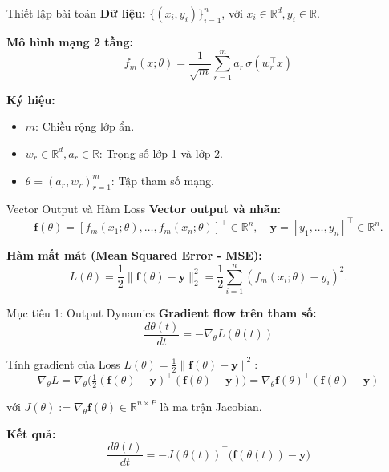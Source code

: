 \begin{frame}{Thiết lập bài toán}
  \textbf{Dữ liệu:} $\{(x_i,y_i)\}_{i=1}^n$, với $x_i \in \mathbb R^d, y_i \in \mathbb R$.

  \vspace{0.4cm}
  \textbf{Mô hình mạng 2 tầng:}
  \[
    f_m(x;\theta) = \frac{1}{\sqrt{m}} \sum_{r=1}^m a_r\,\sigma(w_r^\top x)
  \]
  
  \textbf{Ký hiệu:}
  \begin{itemize}
    \item $m$: Chiều rộng lớp ẩn.
    \item $w_r \in \mathbb R^d, a_r \in \mathbb R$: Trọng số lớp 1 và lớp 2.
    \item $\theta = (a_r, w_r)_{r=1}^m$: Tập tham số mạng.
  \end{itemize}
\end{frame}

\begin{frame}{Vector Output và Hàm Loss}
  \textbf{Vector output và nhãn:}
  \[
    \mathbf{f}(\theta) = [f_m(x_1;\theta), \dots, f_m(x_n;\theta)]^\top \in \mathbb{R}^n,
    \quad
    \mathbf{y} = [y_1, \dots, y_n]^\top \in \mathbb{R}^n.
  \]

  \textbf{Hàm mất mát (Mean Squared Error - MSE):}
  \[
    L(\theta) = \frac{1}{2} \|\mathbf{f}(\theta) - \mathbf{y}\|^2_2
              = \frac{1}{2} \sum_{i=1}^n (f_m(x_i;\theta) - y_i)^2.
  \]
\end{frame}

\begin{frame}{Mục tiêu 1: Output Dynamics}
  \textbf{Gradient flow trên tham số:}
  \[
    \frac{d\theta(t)}{dt} = -\nabla_\theta L(\theta(t))
  \]
  
  Tính gradient của Loss $L(\theta) = \frac{1}{2}\|\mathbf{f}(\theta) - \mathbf{y}\|^2$:
  \[
    \nabla_\theta L
    = \nabla_\theta \Big( \tfrac{1}{2}(\mathbf{f}(\theta) - \mathbf{y})^\top (\mathbf{f}(\theta) - \mathbf{y}) \Big)
    = \nabla_\theta \mathbf{f}(\theta)^\top (\mathbf{f}(\theta) - \mathbf{y})
  \]

  với $J(\theta) := \nabla_\theta \mathbf{f}(\theta) \in \mathbb{R}^{n \times P}$ là ma trận Jacobian.

  \vspace{0.3cm}
  \textbf{Kết quả:}
  \[
    \frac{d\theta(t)}{dt} = -J(\theta(t))^\top \big(\mathbf{f}(\theta(t)) - \mathbf{y}\big)
  \]
\end{frame}

